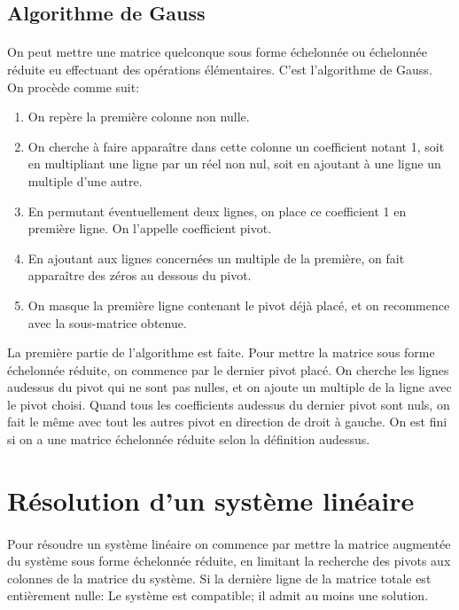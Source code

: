 %
\subsection{Algorithme de Gauss}
%
\paragraph{} On peut mettre une matrice quelconque sous forme échelonnée ou échelonnée réduite eu effectuant des opérations élémentaires. C'est l'algorithme de Gauss. \\
On procède comme suit:
\begin{enumerate}
  \item On repère la première colonne non nulle.
  \item On cherche à faire apparaître dans cette colonne un coefficient notant 1, soit en multipliant une ligne par un réel non nul, soit en ajoutant à une ligne un multiple d'une autre.
  \item En permutant éventuellement deux lignes, on place ce coefficient 1 en première ligne. On l'appelle coefficient pivot.
  \item En ajoutant aux lignes concernées un multiple de la première, on fait apparaître des zéros au dessous du pivot. 
  \item On masque la première ligne contenant le pivot déjà placé, et on recommence avec la sous-matrice obtenue.
\end{enumerate}
La première partie de l'algorithme est faite. Pour mettre la matrice sous forme échelonnée réduite, on commence par le dernier pivot placé. On cherche les lignes audessus du pivot qui ne sont pas nulles, et on ajoute un multiple de la ligne avec le pivot choisi. Quand tous les coefficients audessus du dernier pivot sont nuls, on fait le même avec tout les autres pivot en direction de droit à gauche. On est fini si on a une matrice échelonnée réduite selon la définition audessus.

%
%
\section{Résolution d'un système linéaire}
%
%
\paragraph{} Pour résoudre un système linéaire on commence par mettre la matrice augmentée du système sous forme échelonnée réduite, en limitant la recherche des pivots aux colonnes de la matrice du système.
Si la dernière ligne de la matrice totale est entièrement nulle: Le système est compatible; il admit au moins une solution.
